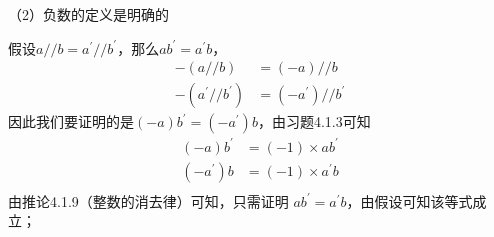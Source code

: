 \documentclass{article}
\theoremstyle{mystyle}
\begin{document}
（2）负数的定义是明确的

假设$a // b = a^\prime // b^\prime$，那么$a b^\prime = a^\prime b$，
\begin{align}
  -(a//b)                 & = (-a)//b               \\
  -(a^\prime // b^\prime) & = (-a^\prime)//b^\prime
\end{align}
因此我们要证明的是$(-a)b^\prime = (-a^\prime)b $，由习题4.1.3可知
\begin{align*}
  (-a)b^\prime & =(-1)\times ab^\prime  \\
  (-a^\prime)b & =(-1)\times a^\prime b \\
\end{align*}
由推论4.1.9（整数的消去律）可知，只需证明
$ab^\prime = a^\prime b$，由假设可知该等式成立；
\end{document}
